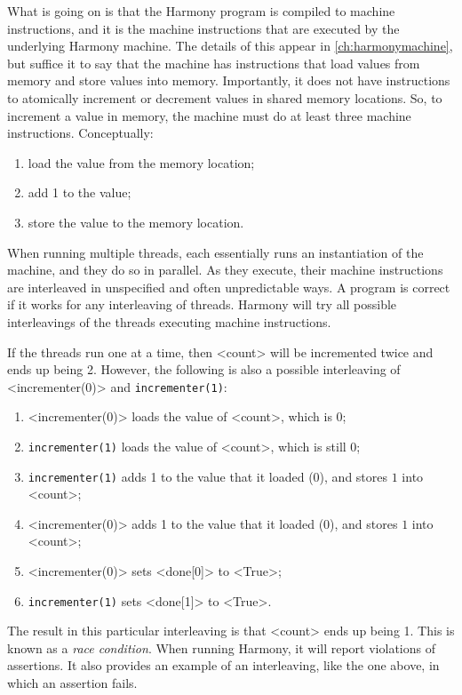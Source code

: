 \documentclass{report}
\begin{document}
%

What is going on is that the Harmony program is compiled to machine instructions,
%
and it is the machine instructions that are executed by the underlying Harmony
machine.  The details of this appear in \autoref{ch:harmonymachine},
but suffice it to
say that the machine has instructions that load values from memory and store
values into memory.  Importantly, it does not have instructions to atomically
increment or decrement values in shared memory locations.
So, to increment a value in memory,
the machine must do at least three machine instructions.  Conceptually:
\begin{enumerate}
\item load the value from the memory location;
\item add 1 to the value;
\item store the value to the memory location.
\end{enumerate}

When running multiple threads, each essentially runs an instantiation of
the machine, and they do so in parallel.  As they execute, their machine
instructions are interleaved
%
in unspecified and often unpredictable ways.
A program is correct if it works for any interleaving of threads.
Harmony will try all possible interleavings of the threads
executing machine instructions.

If the threads run one at a time, then <{count}> will be incremented
twice and ends up being 2.  However, the following is also
a possible interleaving of <{incrementer(0)}> and \texttt{incrementer(1)}:
\begin{enumerate}
\item <{incrementer(0)}> loads the value of <{count}>, which is 0;
\item \texttt{incrementer(1)} loads the value of <{count}>, which is still 0;
\item \texttt{incrementer(1)} adds 1 to the value that it loaded (0), and
stores $1$ into <{count}>;
\item <{incrementer(0)}> adds 1 to the value that it loaded (0), and
stores $1$ into <{count}>;
\item <{incrementer(0)}> sets <{done[0]}> to <{True}>;
\item \texttt{incrementer(1)} sets <{done[1]}> to <{True}>.
\end{enumerate}

The result in this particular interleaving is that <{count}> ends up
being 1.
This is known as a \emph{race condition}.
%
When running Harmony, it will
report violations of assertions.  It also provides an example
of an interleaving, like the one above, in which an assertion fails.
\end{document}
